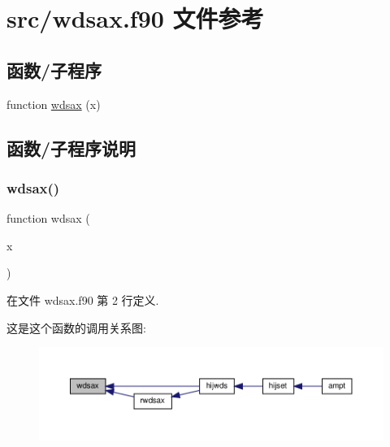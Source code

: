\hypertarget{wdsax_8f90}{}\section{src/wdsax.f90 文件参考}
\label{wdsax_8f90}
\subsection*{函数/子程序}
\begin{DoxyCompactItemize}
\item 
function \mbox{\hyperlink{wdsax_8f90_ab6d8e0a06fe0343f6fcb29eaab8b2325}{wdsax}} (x)
\end{DoxyCompactItemize}


\subsection{函数/子程序说明}
\mbox{\label{wdsax_8f90_ab6d8e0a06fe0343f6fcb29eaab8b2325}} 
\subsubsection{\texorpdfstring{wdsax()}{wdsax()}}
{\footnotesize\ttfamily function wdsax (\begin{DoxyParamCaption}\item[{}]{x }\end{DoxyParamCaption})}



在文件 wdsax.\+f90 第 2 行定义.

这是这个函数的调用关系图\+:
\nopagebreak
\begin{figure}[H]
\begin{center}
\leavevmode
\includegraphics[width=350pt]{wdsax_8f90_ab6d8e0a06fe0343f6fcb29eaab8b2325_icgraph}
\end{center}
\end{figure}
